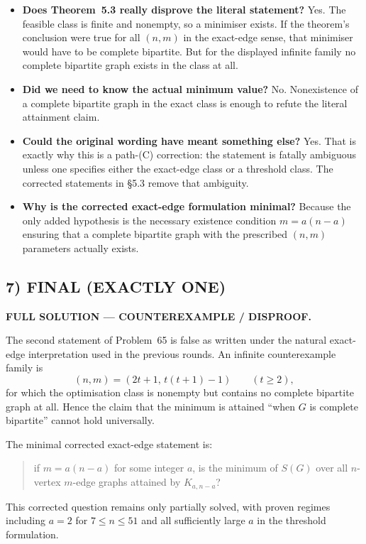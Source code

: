\begin{itemize}
\item \textbf{Does Theorem~5.3 really disprove the literal statement?}
Yes. The feasible class is finite and nonempty, so a minimiser exists. If the theorem's conclusion were true for all $(n,m)$ in the exact-edge sense, that minimiser would have to be complete bipartite. But for the displayed infinite family no complete bipartite graph exists in the class at all.

\item \textbf{Did we need to know the actual minimum value?}
No. Nonexistence of a complete bipartite graph in the exact class is enough to refute the literal attainment claim.

\item \textbf{Could the original wording have meant something else?}
Yes. That is exactly why this is a path-(C) correction: the statement is fatally ambiguous unless one specifies either the exact-edge class or a threshold class. The corrected statements in \S5.3 remove that ambiguity.

\item \textbf{Why is the corrected exact-edge formulation minimal?}
Because the only added hypothesis is the necessary existence condition $m=a(n-a)$ ensuring that a complete bipartite graph with the prescribed $(n,m)$ parameters actually exists.
\end{itemize}

\subsection*{7) FINAL (EXACTLY ONE)}

\textbf{FULL SOLUTION --- COUNTEREXAMPLE / DISPROOF.}

The second statement of Problem~65 is false as written under the natural exact-edge interpretation used in the previous rounds.
An infinite counterexample family is
\[
(n,m)=(2t+1,\,t(t+1)-1)\qquad(t\ge 2),
\]
for which the optimisation class is nonempty but contains no complete bipartite graph at all.
Hence the claim that the minimum is attained ``when $G$ is complete bipartite'' cannot hold universally.

The minimal corrected exact-edge statement is:
\begin{quote}
if $m=a(n-a)$ for some integer $a$, is the minimum of $S(G)$ over all $n$-vertex $m$-edge graphs attained by $K_{a,n-a}$?
\end{quote}
This corrected question remains only partially solved, with proven regimes including $a=2$ for $7\le n\le 51$ and all sufficiently large $a$ in the threshold formulation.

